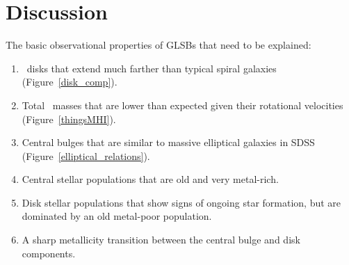 \documentclass{emulateapj}
\newcommand\kms{km s$^{-1}$}
\newcommand\HI{\ion{H}{1}}
\begin{document}








\section{Discussion}

The basic observational properties of GLSBs that need to be explained:
\begin{enumerate}
\item{\HI\ disks that extend much farther than typical spiral galaxies (Figure~\ref{disk_comp}). }
\item{Total \HI\ masses that are lower than expected given their rotational velocities (Figure~\ref{thingsMHI}).}
\item{Central bulges that are similar to massive elliptical galaxies in SDSS (Figure~\ref{elliptical_relations}).}
\item{Central stellar populations that are old and very metal-rich.}
\item{Disk stellar populations that show signs of ongoing star formation, but are dominated by an old metal-poor population.}
\item{A sharp metallicity transition between the central bulge and disk components.}
\end{enumerate}
\end{document}
